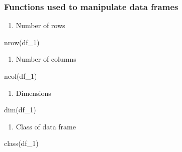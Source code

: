 \documentclass[
  letterpaper,
  DIV=11,
  numbers=noendperiod]{scrreprt}
\newenvironment{Shaded}{}{}
\newcommand{\FunctionTok}[1]{\textcolor[rgb]{0.44,0.26,0.76}{#1}}
\newcommand{\NormalTok}[1]{\textcolor[rgb]{0.14,0.16,0.18}{#1}}
\providecommand{\tightlist}{%
  \setlength{\itemsep}{0pt}\setlength{\parskip}{0pt}}\usepackage{longtable,booktabs,array}
\begin{document}
\subsubsection{Functions used to manipulate data
frames}\label{functions-used-to-manipulate-data-frames}

\begin{enumerate}
\def\labelenumi{\alph{enumi}.}
\tightlist
\item
  Number of rows
\end{enumerate}

\begin{Shaded}
\begin{Highlighting}[]
\FunctionTok{nrow}\NormalTok{(df\_1)}
\end{Highlighting}
\end{Shaded}

\begin{enumerate}
\def\labelenumi{\alph{enumi}.}
\setcounter{enumi}{1}
\tightlist
\item
  Number of columns
\end{enumerate}

\begin{Shaded}
\begin{Highlighting}[]
\FunctionTok{ncol}\NormalTok{(df\_1)}
\end{Highlighting}
\end{Shaded}

\begin{enumerate}
\def\labelenumi{\alph{enumi}.}
\setcounter{enumi}{2}
\tightlist
\item
  Dimensions
\end{enumerate}

\begin{Shaded}
\begin{Highlighting}[]
\FunctionTok{dim}\NormalTok{(df\_1)}
\end{Highlighting}
\end{Shaded}

\begin{enumerate}
\def\labelenumi{\alph{enumi}.}
\setcounter{enumi}{3}
\tightlist
\item
  Class of data frame
\end{enumerate}

\begin{Shaded}
\begin{Highlighting}[]
\FunctionTok{class}\NormalTok{(df\_1)}
\end{Highlighting}
\end{Shaded}
\end{document}
